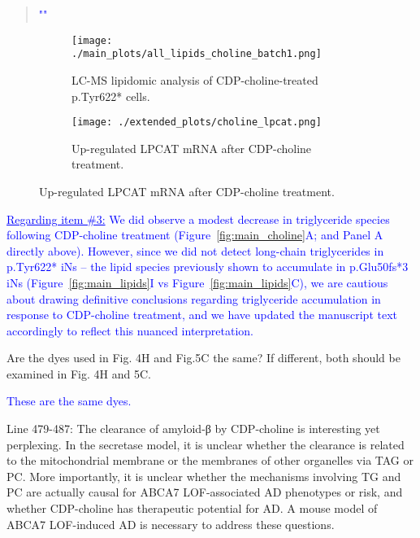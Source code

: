 \begin{quote}
	\textcolor{blue}{"\quoteI"}
\end{quote}

\begin{figure}[H] 
	\begin{subfigure}[t]{0.6\textwidth}
		\caption{LC-MS lipidomic analysis of CDP-choline-treated p.Tyr622* cells.}
		\texttt{[image: ./main\_plots/all\_lipids\_choline\_batch1.png]}        
	\end{subfigure}
	\begin{subfigure}[t]{0.4\textwidth}
		\caption{Up-regulated LPCAT mRNA after CDP-choline treatment.}
		\texttt{[image: ./extended\_plots/choline\_lpcat.png]}        
	\end{subfigure}
\end{figure}

\textcolor{blue}{\underline{Regarding item \#3:} We did  observe a modest decrease in triglyceride species following CDP-choline treatment (Figure~\ref{fig:main_choline}A; and Panel A directly above). However, since we did not detect  long-chain triglycerides in p.Tyr622* iNs – the lipid species previously shown to accumulate in p.Glu50fs*3 iNs (Figure~\ref{fig:main_lipids}I vs Figure~\ref{fig:main_lipids}C), we are cautious about drawing definitive conclusions regarding triglyceride accumulation in response to CDP-choline treatment, and we have updated the manuscript text accordingly to reflect this nuanced interpretation.}

Are the dyes used in Fig. 4H and Fig.5C the same? If different, both should be examined in Fig. 4H and 5C.

\textcolor{blue}{These are the same dyes.}

Line 479-487: The clearance of amyloid-β by CDP-choline is interesting yet perplexing. In the secretase model, it is unclear whether the clearance is related to the mitochondrial membrane or the membranes of other organelles via TAG or PC. More importantly, it is unclear whether the mechanisms involving TG and PC are actually causal for ABCA7 LOF-associated AD phenotypes or risk, and whether CDP-choline has therapeutic potential for AD. A mouse model of ABCA7 LOF-induced AD is necessary to address these questions.

